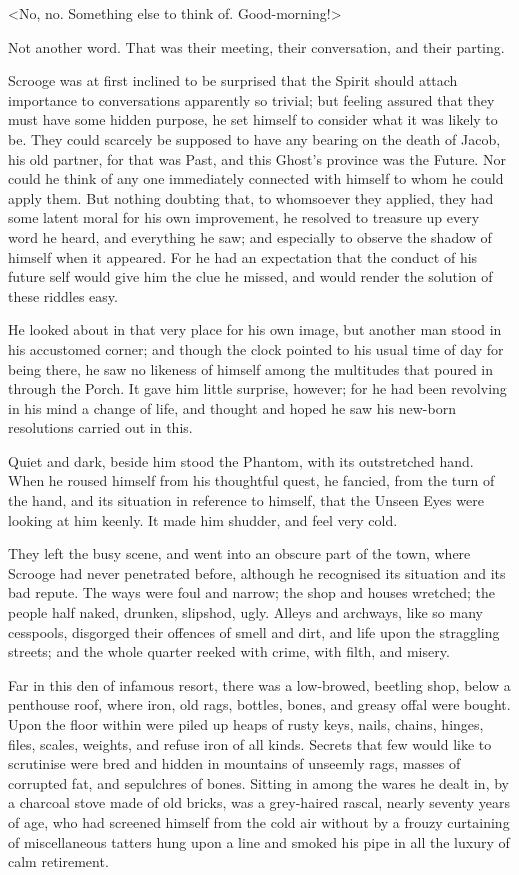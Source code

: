 <No, no. Something else to think of. Good-morning!>

Not another word. That was their meeting, their conversation, and their parting.

Scrooge was at first inclined to be surprised that the Spirit should attach
importance to conversations apparently so trivial; but feeling assured that they
must have some hidden purpose, he set himself to consider what it was likely to
be. They could scarcely be supposed to have any bearing on the death of Jacob,
his old partner, for that was Past, and this Ghost's province was the Future.
Nor could he think of any one immediately connected with himself to whom he
could apply them. But nothing doubting that, to whomsoever they applied, they
had some latent moral for his own improvement, he resolved to treasure up every
word he heard, and everything he saw; and especially to observe the shadow of
himself when it appeared. For he had an expectation that the conduct of his
future self would give him the clue he missed, and would render the solution of
these riddles easy.

He looked about in that very place for his own image, but another man stood in
his accustomed corner; and though the clock pointed to his usual time of day for
being there, he saw no likeness of himself among the multitudes that poured in
through the Porch. It gave him little surprise, however; for he had been
revolving in his mind a change of life, and thought and hoped he saw his
new-born resolutions carried out in this.

Quiet and dark, beside him stood the Phantom, with its out\-stretched hand. When
he roused himself from his thoughtful quest, he fancied, from the turn of the
hand, and its situation in reference to himself, that the Unseen Eyes were
looking at him keenly. It made him shudder, and feel very cold.

They left the busy scene, and went into an obscure part of the town, where
Scrooge had never penetrated before, although he recognised its situation and
its bad repute. The ways were foul and narrow; the shop and houses wretched; the
people half naked, drunken, slipshod, ugly. Alleys and archways, like so many
cesspools, disgorged their offences of smell and dirt, and life upon the
straggling streets; and the whole quarter reeked with crime, with filth, and
misery.

Far in this den of infamous resort, there was a low-browed, beetling shop, below
a penthouse roof, where iron, old rags, bottles, bones, and greasy offal were
bought. Upon the floor within were piled up heaps of rusty keys, nails, chains,
hinges, files, scales, weights, and refuse iron of all kinds. Secrets that few
would like to scrutinise were bred and hidden in mountains of unseemly rags,
masses of corrupted fat, and sepulchres of bones. Sitting in among the wares he
dealt in, by a charcoal stove made of old bricks, was a grey-haired rascal,
nearly seventy years of age, who had screened himself from the cold air without
by a frouzy curtaining of miscellaneous tatters hung upon a line and smoked his
pipe in all the luxury of calm retirement.

